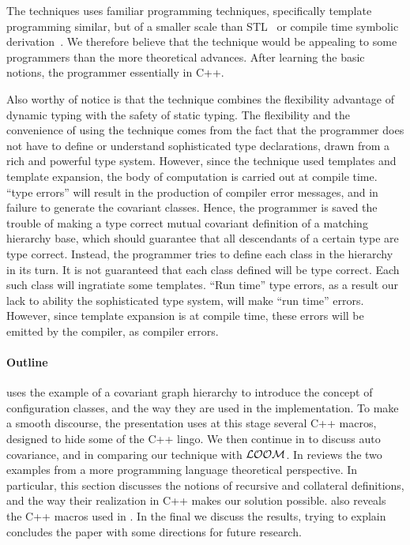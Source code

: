\documentclass[11pt]{article}
\numberwithin{figure}{section}
\newcommand\CC{\Lang{\mbox{C++}}\xspace}
\newcommand\Lang[1]{\textsc{#1}}
\newcommand{\LOOM}{\ensuremath{\cal{LOOM}}\xspace}
\begin{document}
The techniques uses familiar programming techniques,
    specifically template programming similar, but
    of a smaller scale than STL~\cite{Musser:Saini:96}
    or compile time symbolic derivation~\cite{Gil:Gutterman:98}.
We therefore believe that the technique would be appealing
    to some programmers than the more theoretical advances.
After learning the basic notions, the programmer
    essentially in \CC{}.

Also worthy of notice is that the technique combines
    the flexibility advantage of dynamic typing with
    the safety of static typing.
The flexibility and the convenience of using the technique
    comes from the fact that the programmer does not have
    to define or understand sophisticated type declarations,
    drawn from a rich and powerful type system.
However, since the technique used templates and template
    expansion, the body of computation is carried out
    at compile time.
``type errors'' will result in the production of compiler error messages,
    and in failure to generate the covariant classes.
Hence, the programmer is saved the trouble of making a
    type correct mutual covariant definition of a matching hierarchy
    base, which should guarantee that all descendants
    of a certain type are type correct.
Instead, the programmer tries to define each
    class in the hierarchy in its turn.
It is not guaranteed that each class defined will
    be type correct.
Each such class will ingratiate some templates.
``Run time'' type errors, as a result our lack to ability
    the sophisticated type system, will make ``run time'' errors.
However, since template expansion is at compile time, these
    errors will be emitted by the compiler, as compiler errors.



\paragraph{Outline}
 uses the example of a covariant graph hierarchy to introduce
    the concept of configuration classes, and the way they are used in the implementation.
To make a smooth discourse, the presentation uses at this stage several
    \CC macros, designed to hide some of the \CC lingo.
We then continue in 
    to discuss auto covariance, and in comparing our technique with \LOOM.
In  reviews the two examples from a more programming language
    theoretical perspective.
In particular, this section discusses the notions of recursive
    and collateral definitions, and the way their realization
    in \CC makes our solution possible.
 also reveals the \CC{} macros used
    in .
In the final  we discuss the results, trying
    to explain concludes the paper with
    some directions for future research.
\end{document}
